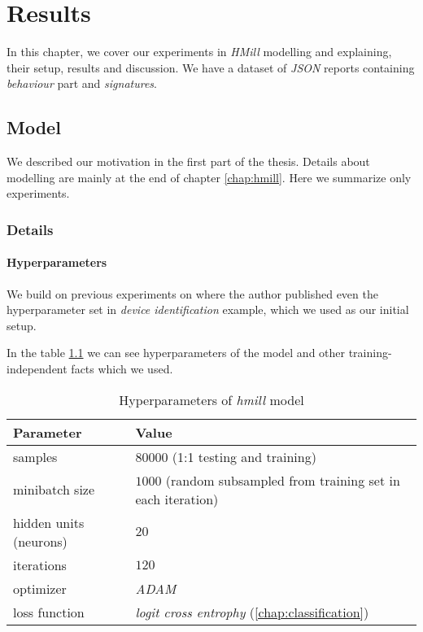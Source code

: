 \chapter{Results} \label{chap:results}
In this chapter, we cover our experiments in \emph{HMill} modelling and explaining, their setup, results and discussion. We have a dataset of \emph{JSON} reports containing \emph{behaviour} part and \emph{signatures}.

\section{Model}
We described our motivation in the first part of the thesis. Details about modelling are mainly at the end of chapter \ref{chap:hmill}. Here we summarize only experiments.

\subsection{Details}
\subsubsection{Hyperparameters}
We build on previous experiments on \cite{Mandlik2020} where the author published even the hyperparameter set in \emph{device identification} example, which we used as our initial setup.

In the table \ref{tab:hyperparams} we can see hyperparameters of the model and other training-independent facts which we used.

\begin{table}[h]
  \centering
  \caption{Hyperparameters of \emph{hmill} model}
  \begin{tabular}{p{6cm}p{8cm}} 
      \toprule
      \textbf{Parameter} &
      \textbf{Value} \\
      \midrule
      samples & $80000$ (1:1 testing and training) \\
      \midrule
      minibatch size & $1000$ (random subsampled from training set in each iteration)\\
      \midrule
      hidden units (neurons)& $20$\\
      \midrule
      iterations & $120$\\
      \midrule
      optimizer & \emph{ADAM} \cite{Kingma2014}\\
      \midrule
      loss function & \emph{logit cross entrophy} (\ref{chap:classification})\\
      \bottomrule
  \end{tabular}
  \label{tab:hyperparams}
\end{table}

